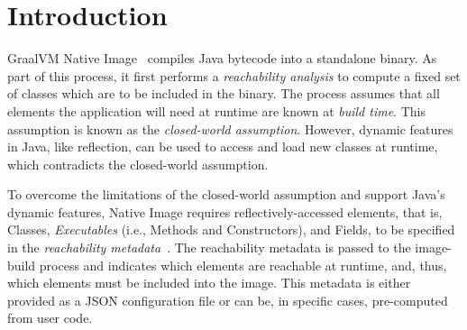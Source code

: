 \chapter{Introduction}


GraalVM Native Image~\cite{noauthor_native_nodate} compiles Java bytecode into a standalone binary. As part of this process, it first performs a \emph{reachability analysis} to compute a fixed set of classes which are to be included in the binary. 
The process assumes that all elements the application will need at runtime are known at \emph{build time}. This assumption is known as the \emph{closed-world assumption}.
However, dynamic features in Java, like reflection, can be used to access and load new classes at runtime, which contradicts the closed-world assumption. 

To overcome the limitations of the closed-world assumption and support Java's dynamic features, Native Image requires reflectively-accessed elements, that is, Classes, \emph{Executables} (i.e., Methods and Constructors), and Fields, to be specified in the \emph{reachability metadata}~\cite{noauthor_reachability_nodate}. The reachability metadata is passed to the image-build process and indicates which elements are reachable at runtime, and, thus, which elements must be included into the image. This metadata is either provided as a JSON configuration file or can be, in specific cases, pre-computed from user code. 

